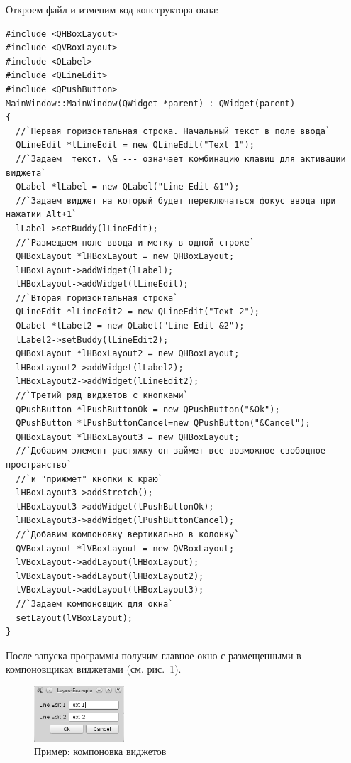 Откроем файл  и изменим код конструктора окна:
\begin{lstlisting}
#include <QHBoxLayout>
#include <QVBoxLayout>
#include <QLabel>
#include <QLineEdit>
#include <QPushButton>
MainWindow::MainWindow(QWidget *parent) : QWidget(parent)
{
  //`Первая горизонтальная строка. Начальный текст в поле ввода`
  QLineEdit *lLineEdit = new QLineEdit("Text 1");
  //`Задаем  текст. \& --- означает комбинацию клавиш для активации виджета`
  QLabel *lLabel = new QLabel("Line Edit &1");
  //`Задаем виджет на который будет переключаться фокус ввода при нажатии Alt+1`
  lLabel->setBuddy(lLineEdit);
  //`Размещаем поле ввода и метку в одной строке`
  QHBoxLayout *lHBoxLayout = new QHBoxLayout;
  lHBoxLayout->addWidget(lLabel);
  lHBoxLayout->addWidget(lLineEdit);
  //`Вторая горизонтальная строка`
  QLineEdit *lLineEdit2 = new QLineEdit("Text 2");
  QLabel *lLabel2 = new QLabel("Line Edit &2");
  lLabel2->setBuddy(lLineEdit2);
  QHBoxLayout *lHBoxLayout2 = new QHBoxLayout;
  lHBoxLayout2->addWidget(lLabel2);
  lHBoxLayout2->addWidget(lLineEdit2);
  //`Третий ряд виджетов с кнопками`
  QPushButton *lPushButtonOk = new QPushButton("&Ok");
  QPushButton *lPushButtonCancel=new QPushButton("&Cancel");
  QHBoxLayout *lHBoxLayout3 = new QHBoxLayout;
  //`Добавим элемент-растяжку он займет все возможное свободное пространство`
  //`и "прижмет" кнопки к краю`
  lHBoxLayout3->addStretch();
  lHBoxLayout3->addWidget(lPushButtonOk);
  lHBoxLayout3->addWidget(lPushButtonCancel);
  //`Добавим компоновку вертикально в колонку`
  QVBoxLayout *lVBoxLayout = new QVBoxLayout;
  lVBoxLayout->addLayout(lHBoxLayout);
  lVBoxLayout->addLayout(lHBoxLayout2);
  lVBoxLayout->addLayout(lHBoxLayout3);
  //`Задаем компоновщик для окна`
  setLayout(lVBoxLayout);
}
\end{lstlisting}

После запуска программы получим главное окно с размещенными в компоновщиках  виджетами (см. рис.~\ref{ch13:refDrawing4}).
\begin{figure}[htb]
\begin{center}
\includegraphics[width=0.3\textwidth]{img/ris_13_5}
\caption[Пример: компоновка виджетов]{Пример: компоновка виджетов}
\label{ch13:refDrawing4}
\end{center}
\end{figure}

